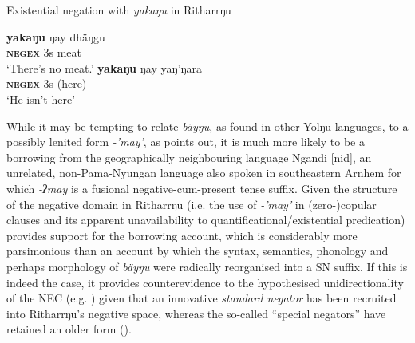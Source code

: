 \documentclass[output=paper]{langsci/langscibook}
\begin{document}
\begin{exe}\ex\label{ex:austr-exist-neg-rith} 
    Existential negation with {\em yakaŋu} in Ritharrŋu
    \begin{xlist}
\ex\gll \textbf{yakaŋu} ŋay dhäŋgu\\
\textsc{\textbf{negex}} 3s meat\\
\glt `There's no meat.' \hfill {\citep[102]{Heath1980}}
%
\ex\label{ex:austr-exist-neg-rith-here}
        \gll \textbf{yakaŋu} ŋay {\op}yaŋ'ŋara{\cp}\\
\textsc{\textbf{negex}} 3s (here)\\
\glt `He isn't here' \hfill {\citep[102]{Heath1980}}
    \end{xlist}\end{exe}

While it may be tempting to relate \textit{bäyŋu}, as found in other Yolŋu
    languages, to a possibly lenited form \textit{-'may'}, as
    \citet[102]{Heath1980} points out, it is much more likely to be a
    borrowing from the geographically neighbouring language
    Ngandi [nid], an unrelated, non-Pama-Nyungan language also
    spoken in southeastern Arnhem for which \textit{-ʔmay} is a fusional
    negative-cum-present tense suffix. Given the structure of the negative
    domain in Ritharrŋu (i.e. the use of \textit{-'may'} in (zero-)copular
    clauses  and its apparent
    unavailability to quantificational\slash existential predication)
    provides support for
    the borrowing account, which is considerably more parsimonious than an
    account by which the syntax, semantics, phonology and perhaps
    morphology  of \textit{bäyŋu} were radically reorganised into a SN
    suffix.
    If this is indeed the case, it provides counterevidence to the
    hypothesised unidirectionality of the NEC (e.g.
    \citealt[146]{Veselinova2016}) given that an innovative
    \textit{standard negator} has been recruited into Ritharrŋu's negative
    space, whereas the so-called ``special negators''
    have retained an older form ().
%
\end{document}
